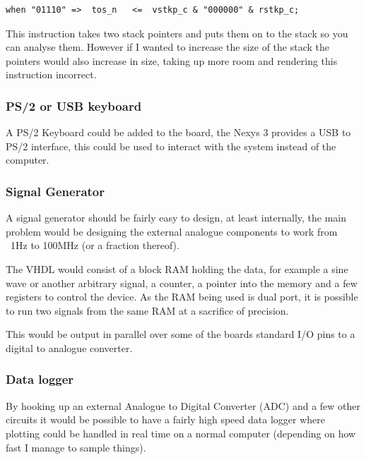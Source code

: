 \documentclass	[a4paper, 10pt]	{article}
\begin{document}
        
\begin{lstlisting}
when "01110" =>  tos_n   <=  vstkp_c & "000000" & rstkp_c; 
\end{lstlisting}

        This instruction takes two stack pointers and puts them on to the stack so
        you can analyse them. However if I wanted to increase the size of the
        stack the pointers would also increase in size, taking up more room and
        rendering this instruction incorrect.

      \subsubsection{PS/2 or USB keyboard}

      A PS/2 Keyboard could be added to the board, the Nexys 3 provides a USB
      to PS/2 interface, this could be used to interact with the system instead
      of the computer.

      \subsubsection{Signal Generator}

      A signal generator should be fairly easy to design, at least internally, the
      main problem would be designing the external analogue components to work from
      ~1Hz to 100MHz (or a fraction thereof).

      The VHDL would consist of a block RAM holding the data, for example a sine wave
      or another arbitrary signal, a counter, a pointer into the memory and a few
      registers to control the device. As the RAM being used is dual port, it is
      possible to run two signals from the same RAM at a sacrifice of precision.

      This would be output in parallel over some of the boards standard I/O pins
      to a digital to analogue converter.

      \subsubsection{Data logger}

      By hooking up an external Analogue to Digital Converter (ADC) and a few other
      circuits it would be possible to have a fairly high speed data logger where
      plotting could be handled in real time on a normal computer (depending on how
      fast I manage to sample things).
\end{document}
